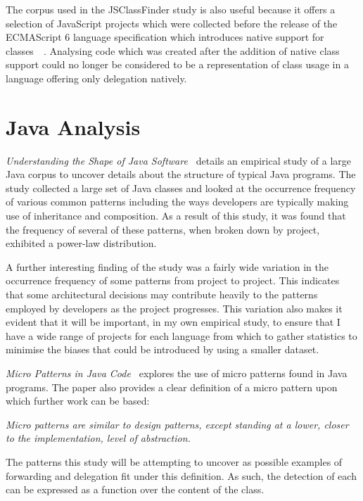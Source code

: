 The corpus used in the JSClassFinder study is also useful because it offers a selection of JavaScript projects which were collected before the release of the ECMAScript 6 language specification which introduces native support for classes~\cite{ES6Spec}~\cite{JSClassFinder}. Analysing code which was created after the addition of native class support could no longer be considered to be a representation of class usage in a language offering only delegation natively.

\section{Java Analysis}
\textit{Understanding the Shape of Java Software~\cite{ShapeOfJava}} details an empirical study of a large Java corpus to uncover details about the structure of typical Java programs. The study collected a large set of Java classes and looked at the occurrence frequency of various common patterns including the ways developers are typically making use of inheritance and composition. As a result of this study, it was found that the frequency of several of these patterns, when broken down by project, exhibited a power-law distribution.
\newline

A further interesting finding of the study was a fairly wide variation in the occurrence frequency of some patterns from project to project. This indicates that some architectural decisions may contribute heavily to the patterns employed by developers as the project progresses. This variation also makes it evident that it will be important, in my own empirical study, to ensure that I have a wide range of projects for each language from which to gather statistics to minimise the biases that could be introduced by using a smaller dataset.
\newline

\textit{Micro Patterns in Java Code~\cite{JavaMicropatterns}} explores the use of micro patterns found in Java programs. The paper also provides a clear definition of a micro pattern upon which further work can be based:
\begin{displayquote}\textit{
	Micro patterns are similar to design patterns, except standing at a lower, closer to the implementation, level of abstraction.~\cite{JavaMicropatterns}
}\end{displayquote}
The patterns this study will be attempting to uncover as possible examples of forwarding and delegation fit under this definition. As such, the detection of each can be expressed as a function over the content of the class.
\newline


